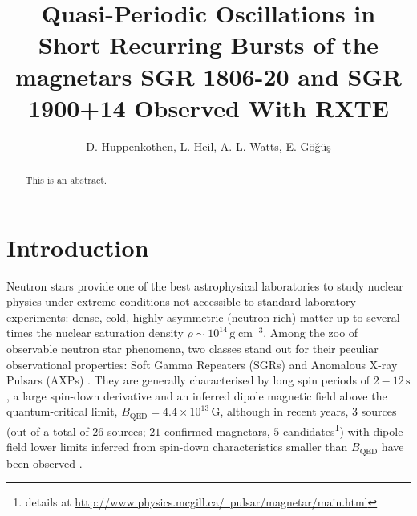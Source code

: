 \documentclass[numberedappendix]{emulateapj}
\begin{document}
\title{Quasi-Periodic Oscillations in Short Recurring Bursts of the magnetars SGR 1806-20 and SGR 1900+14 Observed With RXTE}

\author{D. Huppenkothen, L. Heil, A. L. Watts,  E. G{\"o}{\u g}{\"u}{\c s}}

 


\begin{abstract}
This is an abstract. 
\end{abstract}
\begin{abstract}
\end{abstract} 



\section{Introduction}

Neutron stars provide one of the best astrophysical laboratories to study nuclear physics under extreme conditions not accessible to standard laboratory experiments: dense, cold, highly asymmetric (neutron-rich) matter up to several times the nuclear saturation density $\rho \sim 10^{14} \, \mathrm{g}\; \mathrm{cm}^{-3}$.
Among the zoo of observable neutron star phenomena, two classes stand out for their peculiar observational properties: Soft Gamma Repeaters (SGRs) and Anomalous X-ray Pulsars (AXPs) \citep[for general overviews of both phenomena, see ][]{woods2006,mereghetti2011}.
They are generally characterised by long spin periods of $2 - 12 \, \mathrm{s}$, a large spin-down derivative and an inferred dipole magnetic field above the quantum-critical limit, $B_{\mathrm{QED}} = 4.4 \times 10^{13} \, \mathrm{G}$, although in recent years, $3$ sources (out of a total of $26$ sources; $21$ confirmed magnetars, $5$ candidates\footnote{details at \hyperref[]{http://www.physics.mcgill.ca/~pulsar/magnetar/main.html}}) with dipole field lower limits inferred from spin-down characteristics smaller than $B_{\mathrm{QED}}$ have been observed \citep{vanderhorst2010,esposito2010,rea2010,rea2012,scholz2012,rea2014}. 
\end{document}
